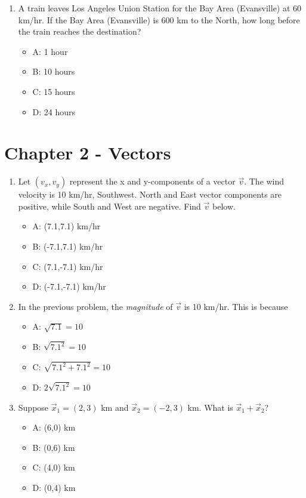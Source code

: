 \documentclass{article}
\begin{document}
\begin{enumerate}
\item A train leaves Los Angeles Union Station for the Bay Area (Evansville) at 60 km/hr.  If the Bay Area (Evansville) is 600 km to the North, how long before the train reaches the destination?
\begin{itemize}
\item A: 1 hour
\item B: 10 hours
\item C: 15 hours
\item D: 24 hours
\end{itemize}
\end{enumerate}

\section{Chapter 2 - Vectors}

\begin{enumerate}
\item Let $(v_x,v_y)$ represent the x and y-components of a vector $\vec{v}$.  The wind velocity is 10 km/hr, Southwest.  North and East vector components are positive, while South and West are negative.  Find $\vec{v}$ below.
\begin{itemize}
\item A: (7.1,7.1) km/hr
\item B: (-7.1,7.1) km/hr
\item C: (7.1,-7.1) km/hr
\item D: (-7.1,-7.1) km/hr
\end{itemize}
\item In the previous problem, the \textit{magnitude} of $\vec{v}$ is 10 km/hr.  This is because
\begin{itemize}
\item A: $\sqrt{7.1} = 10$
\item B: $\sqrt{7.1^2} = 10$
\item C: $\sqrt{7.1^2 + 7.1^2} = 10$
\item D: $2\sqrt{7.1^2} = 10$
\end{itemize}
\item Suppose $\vec{x}_1 = (2,3)$ km and $\vec{x}_2 = (-2,3)$ km.  What is $\vec{x}_1 + \vec{x}_2$?
\begin{itemize}
\item A: (6,0) km
\item B: (0,6) km
\item C: (4,0) km
\item D: (0,4) km
\end{itemize}
\end{enumerate}
\end{document}
